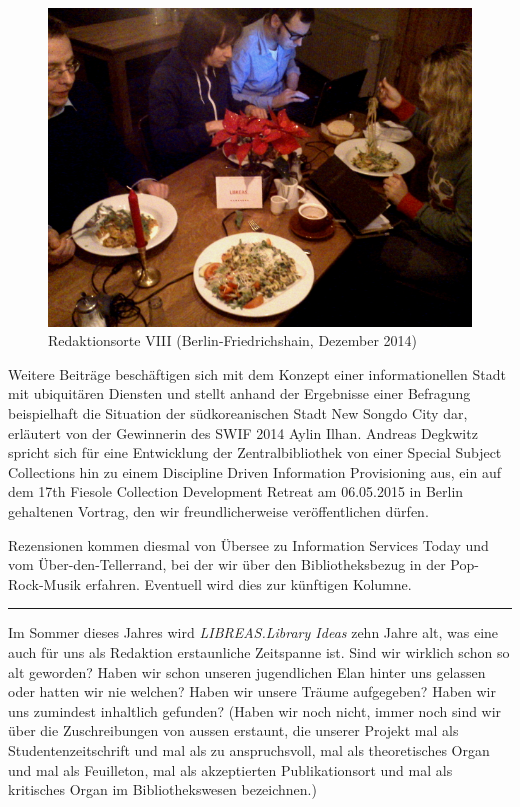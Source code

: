 \documentclass[a4paper,
fontsize=11pt,
oneside,
numbers=noperiodatend,
parskip=half-,
bibliography=totoc,
final
]{scrartcl}
\begin{document}
\begin{figure}[htbp]
\centering
\includegraphics{editorial.jpg}
\caption{Redaktionsorte VIII (Berlin-Friedrichshain, Dezember 2014)}
\end{figure}

Weitere Beiträge beschäftigen sich mit dem Konzept einer
informationellen Stadt mit ubiquitären Diensten und stellt anhand der
Ergebnisse einer Befragung beispielhaft die Situation der
südkoreanischen Stadt New Songdo City dar, erläutert von der Gewinnerin
des SWIF 2014 Aylin Ilhan. Andreas Degkwitz spricht sich für eine
Entwicklung der Zentralbibliothek von einer Special Subject Collections
hin zu einem Discipline Driven Information Provisioning aus, ein auf dem
17th Fiesole Collection Development Retreat am 06.05.2015 in Berlin
gehaltenen Vortrag, den wir freundlicherweise veröffentlichen dürfen.

Rezensionen kommen diesmal von Übersee zu Information Services Today und
vom Über-den-Tellerrand, bei der wir über den Bibliotheksbezug in der
Pop-Rock-Musik erfahren. Eventuell wird dies zur künftigen Kolumne.

\begin{center}\rule{0.5\linewidth}{\linethickness}\end{center}

Im Sommer dieses Jahres wird \emph{LIBREAS.Library Ideas} zehn Jahre
alt, was eine auch für uns als Redaktion erstaunliche Zeitspanne ist.
Sind wir wirklich schon so alt geworden? Haben wir schon unseren
jugendlichen Elan hinter uns gelassen oder hatten wir nie welchen? Haben
wir unsere Träume aufgegeben? Haben wir uns zumindest inhaltlich
gefunden? (Haben wir noch nicht, immer noch sind wir über die
Zuschreibungen von aussen erstaunt, die unserer Projekt mal als
Studentenzeitschrift und mal als zu anspruchsvoll, mal als theoretisches
Organ und mal als Feuilleton, mal als akzeptierten Publikationsort und
mal als kritisches Organ im Bibliothekswesen bezeichnen.)
\end{document}
